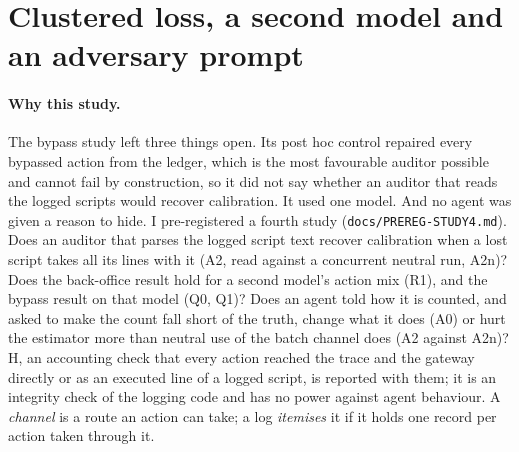 \documentclass[11pt]{article}
\begin{document}
\section{Clustered loss, a second model and an adversary prompt}
\label{sec:study4}

\paragraph{Why this study.} The bypass study left three things open. Its post hoc control
repaired every bypassed action from the ledger, which is the most favourable auditor possible
and cannot fail by construction, so it did not say whether an auditor that reads the logged
scripts would recover calibration. It used one model. And no agent was given a reason to
hide. I pre-registered a fourth study (\texttt{docs/PREREG-STUDY4.md}). Does an auditor that
parses the logged script text recover calibration when a lost script takes all its lines with
it (A2, read against a concurrent neutral run, A2n)? Does the back-office result hold for a
second model's action mix (R1), and the bypass result on that model (Q0, Q1)? Does an agent
told how it is counted, and asked to make the count fall short of the truth, change what it
does (A0) or hurt the estimator more than neutral use of the batch channel does (A2 against
A2n)? H, an accounting check that every action reached the trace and the gateway directly or
as an executed line of a logged script, is reported with them; it is an integrity check of
the logging code and has no power against agent behaviour. A \emph{channel} is a route an
action can take; a log \emph{itemises} it if it holds one record per action taken through it.
\end{document}
